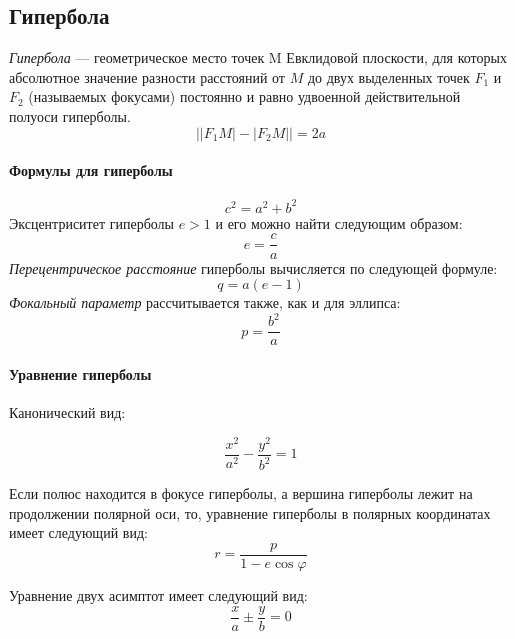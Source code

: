\subsection{Гипербола}
 
\textit{Гипербола} --- геометрическое место точек M Евклидовой плоскости, для которых абсолютное значение разности расстояний от $M$ до двух выделенных точек $F_1$ и $F_2$ (называемых фокусами) постоянно и равно удвоенной действительной полуоси гиперболы.
\begin{equation}
\bigl||F_1M|-|F_2M|\bigr|=2a
\end{equation}
\paragraph{Формулы для гиперболы}
\begin{equation}
c^2=a^2+b^2
\end{equation}
Эксцентриситет гиперболы $e>1$ и его можно найти следующим образом:
\begin{equation}
e=\frac{c}{a}
\end{equation}
\textit{Перецентрическое расстояние} гиперболы вычисляется по следующей формуле:
\begin{equation}
q=a(e-1)
\end{equation}
\textit{Фокальный параметр} рассчитывается также, как и для эллипса:
\begin{equation}
p=\frac{b^2}{a}
\end{equation}

\paragraph{Уравнение гиперболы}
\begin{flushleft}
Канонический вид:
\end{flushleft}

\begin{equation}
\frac{x^2}{a^2}-\frac{y^2}{b^2}=1
\end{equation}

Если полюс находится в фокусе гиперболы, а вершина гиперболы лежит на продолжении полярной оси, то, уравнение гиперболы в полярных координатах имеет следующий вид:
\begin{equation}
r=\frac{p}{1-e\cos\varphi}
\end{equation}

Уравнение двух асимптот имеет следующий вид:
\begin{equation}
\frac{x}{a}\pm\frac{y}{b}=0
\end{equation}

